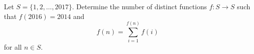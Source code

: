 Let $S=\{1,2,\dots,2017\}$. Determine the number of distinct functions $f\colon S\to S$ such that $f(2016)=2014$ and
\[
	f(n)=\sum_{i=1}^{f(n)}f(i)
\]
for all $n\in S$.